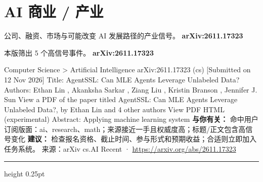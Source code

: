 \documentclass[10.5pt]{ctexart}
\begin{document}
\section*{AI 商业 / 产业}
{\color{ormuted} 公司、融资、市场与可能改变 AI 发展路径的产业信号。}
\vspace{2mm}
{\LARGE\bfseries arXiv:2611.17323}\par
\vspace{1mm}
{\color{ormuted} 本版筛出 5 个高信号事件。}
\vspace{3mm}
{\Large\bfseries arXiv:2611.17323}\par
Computer Science > Artificial Intelligence arXiv:2611.17323 (cs) [Submitted on 12 Nov 2026] Title: AgentSSL: Can MLE Agents Leverage Unlabeled Data? Authors: Ethan Lin , Akanksha Sarkar , Ziang Liu , Kristin Branson , Jennifer J. Sun View a PDF of the paper titled AgentSSL: Can MLE Agents Leverage Unlabeled Data?, by Ethan Lin and 4 other authors View PDF HTML (experimental) Abstract: Applying machine learning system
\textbf{与你有关：} 命中用户订阅版面：ai、research、math；来源接近一手且权威度高；标题/正文包含高信号变化
\textbf{建议：} 检查报名资格、截止时间、参与形式和预期收益；合适则立即加入任务系统。
{\footnotesize\color{ormuted} 来源：arXiv cs.AI Recent · \url{https://arxiv.org/abs/2611.17323}}
\vspace{4mm}
\hrule height 0.25pt
\vspace{3mm}
\end{document}
